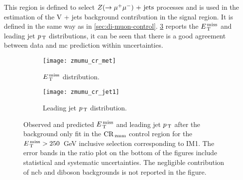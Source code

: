 This region is defined to select $Z (\rightarrow \mu^+ \mu^-)\mathrm{~+~jets}$ processes and is used in the
estimation of the V + jets background contribution in the signal region. It is
defined in the same way as in
\cref{sec:di-muon-control}. \cref{fig:dimu_cr_plots} reports the $E_\mathrm{\, T}^\mathrm{\, miss}$ and
leading jet $p_\mathrm{\, T}$ distributions, it can be seen that there is a good agreement
between data and \gls{mc} prediction within uncertainties.
\begin{figure}[!th]
  \centering
  \begin{subfigure}[t]{.48\linewidth}
    \texttt{[image: zmumu\_cr\_met]}
    \caption{$E_\mathrm{\, T}^\mathrm{\, miss}$ distribution.}
    \label{fig:dimu_cr_met}
  \end{subfigure}
  \begin{subfigure}[t]{.48\linewidth}
    \texttt{[image: zmumu\_cr\_jet1]}
    \caption{Leading jet $p_\mathrm{\, T}$ distribution.}
    \label{fig:dimu_cr_jet1}
  \end{subfigure}
  \caption{Observed and predicted $E_\mathrm{\, T}^\mathrm{\, miss}$ and leading jet $p_\mathrm{\, T}$ after the
    background only fit in the $\mathrm{CR}_\mathrm{\, zmm}$ control region for the $E_\mathrm{\, T}^\mathrm{\, miss} > 250$~GeV
    inclusive selection corresponding to IM1. The error bands in the ratio plot
    on the bottom of the figures include statistical and systematic
    uncertainties. The negligible contribution of \gls{ncb} and diboson
    backgrounds is not reported in the figure.}
  \label{fig:dimu_cr_plots}
\end{figure}
